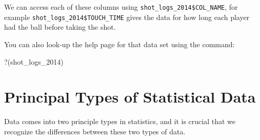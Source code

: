 \documentclass[
]{book}
\newenvironment{Shaded}{\begin{snugshade}}{\end{snugshade}}
\newcommand{\AttributeTok}[1]{\textcolor[rgb]{0.77,0.63,0.00}{#1}}
\newcommand{\NormalTok}[1]{#1}
\newcommand{\StringTok}[1]{\textcolor[rgb]{0.31,0.60,0.02}{#1}}
\theoremstyle{definition}
\theoremstyle{definition}
\theoremstyle{definition}
\theoremstyle{definition}
\theoremstyle{remark}
\begin{document}
We can access each of these columns using \texttt{shot\_logs\_2014\$COL\_NAME}, for example \texttt{shot\_logs\_2014\$TOUCH\_TIME} gives the data for how long each player had the ball before taking the shot.

You can also look-up the help page for that data set using the command:

\begin{Shaded}
\begin{Highlighting}[]
\StringTok{\textasciigrave{}}\AttributeTok{?}\StringTok{\textasciigrave{}}\NormalTok{(shot\_logs\_2014)}
\end{Highlighting}
\end{Shaded}

\hypertarget{principal-types-of-statistical-data}{%
\section{Principal Types of Statistical Data}\label{principal-types-of-statistical-data}}

Data comes into two principle types in statistics, and it is crucial that we recognize the differences between these two types of data.
\end{document}
